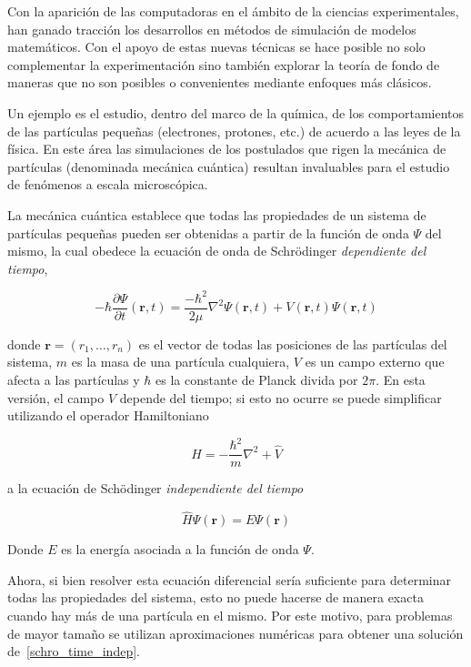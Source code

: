 Con la aparici\'on de las computadoras en el \'ambito de la ciencias experimentales, han
ganado tracci\'on los desarrollos en m\'etodos de simulaci\'on de modelos matem\'aticos. 
Con el apoyo de estas nuevas t\'ecnicas se hace posible no solo
complementar la experimentaci\'on sino tambi\'en explorar la teor\'ia de fondo de maneras que
no son posibles o convenientes mediante enfoques m\'as cl\'asicos.

Un ejemplo es el estudio, dentro del marco de la qu\'imica, de los comportamientos de las 
part\'iculas peque\~nas (electrones, protones, etc.) de acuerdo a las leyes de la f\'isica. En este \'area las
simulaciones de los postulados que rigen la mec\'anica de part\'iculas (denominada mec\'anica cu\'antica)
resultan invaluables para el estudio de fen\'omenos a escala microsc\'opica.

La mec\'anica cu\'antica establece que todas las propiedades de un sistema de part\'iculas peque\~nas
pueden ser obtenidas a partir de la funci\'on de onda $\Psi$ del mismo, la cual obedece la 
ecuaci\'on de onda de Schr\"odinger \textit{dependiente del tiempo},

\begin{equation}
    \label{schro_time_dep}
    -\hbar\frac{\partial \Psi}{\partial t} (\mathbf{r},t) = \frac{-\hbar^2}{2\mu}\nabla^2 \Psi(\mathbf{r},t) + V(\mathbf{r},t) \Psi(\mathbf{r},t)
\end{equation}

donde $\mathbf{r} = (r_1,\dots,r_n)$ es el vector de todas las posiciones de las part\'iculas del sistema,
$m$ es la masa de una part\'icula cualquiera, $V$ es un campo externo que afecta a las part\'iculas y
$\hbar$ es la constante de Planck divida por $2\pi$. En esta versi\'on, el campo $V$ depende del tiempo; si
esto no ocurre se puede simplificar utilizando el operador Hamiltoniano

\begin{equation*}
    \hat{H} =  -\frac{\hbar^2}{m} \nabla^2 + \hat{V}
\end{equation*}

a la ecuaci\'on de Sch\"odinger \textit{independiente del tiempo}

\begin{equation}
    \label{schro_time_indep}
    \hat{H} \Psi(\mathbf{r}) = E \Psi(\mathbf{r})
\end{equation}

Donde $E$ es la energ\'ia asociada a la funci\'on de onda $\Psi$.

Ahora, si bien resolver esta ecuaci\'on diferencial ser\'ia suficiente para determinar todas las propiedades del sistema, esto no puede hacerse de 
manera exacta cuando hay m\'as de una part\'icula en el mismo. Por este motivo, para problemas de mayor tama\~no se utilizan aproximaciones num\'ericas
para obtener una soluci\'on de~\ref{schro_time_indep}.

